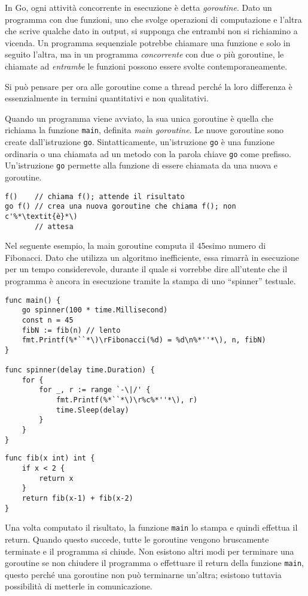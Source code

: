 In Go, ogni attività concorrente in esecuzione è detta \textit{goroutine}.
Dato un programma con due funzioni, uno che svolge operazioni di computazione e l'altra che scrive qualche dato in output, si supponga che entrambi non si richiamino a vicenda.
Un programma sequenziale potrebbe chiamare una funzione e solo in seguito l'altra, ma in un programma \textit{concorrente} con due o più goroutine, le chiamate ad \textit{entrambe} le funzioni possono essere svolte contemporaneamente.

Si può pensare per ora alle goroutine come a thread perché la loro differenza è essenzialmente in termini quantitativi e non qualitativi.

Quando un programma viene avviato, la sua unica goroutine è quella che richiama la funzione \verb|main|, definita \textit{main goroutine}.
Le nuove goroutine sono create dall'istruzione \verb|go|.
Sintatticamente, un'istruzione \verb|go| è una funzione ordinaria o una chiamata ad un metodo con la parola chiave \verb|go| come prefisso.
Un'istruzione \verb|go| permette alla funzione di essere chiamata da una nuova e goroutine.
\begin{lstlisting}[frame=single, label={lst:lstlisting7-1.1}]
f()    // chiama f(); attende il risultato
go f() // crea una nuova goroutine che chiama f(); non c'%*\textit{è}*\)
       // attesa
\end{lstlisting}
Nel seguente esempio, la main goroutine computa il 45esimo numero di Fibonacci.
Dato che utilizza un algoritmo inefficiente, essa rimarrà in esecuzione per un tempo considerevole, durante il quale si vorrebbe dire all'utente che il programma è ancora in esecuzione tramite la stampa di uno ``spinner'' testuale.
\begin{lstlisting}[frame=single, label={lst:lstlisting7-1.2}]
func main() {
    go spinner(100 * time.Millisecond)
    const n = 45
    fibN := fib(n) // lento
    fmt.Printf(%*``*\)\rFibonacci(%d) = %d\n%*''*\), n, fibN)
}

func spinner(delay time.Duration) {
    for {
        for _, r := range `-\|/' {
            fmt.Printf(%*``*\)\r%c%*''*\), r)
            time.Sleep(delay)
        }
    }
}
\end{lstlisting}
\begin{lstlisting}[frame=single, label={lst:lstlisting7-1.3}]
func fib(x int) int {
    if x < 2 {
        return x
    }
    return fib(x-1) + fib(x-2)
}
\end{lstlisting}
Una volta computato il risultato, la funzione \verb|main| lo stampa e quindi effettua il return.
Quando questo succede, tutte le goroutine vengono bruscamente terminate e il programma si chiude.
Non esistono altri modi per terminare una goroutine se non chiudere il programma o effettuare il return della funzione \verb|main|, questo perché una goroutine non può terminarne un'altra;
esistono tuttavia possibilità di metterle in comunicazione.